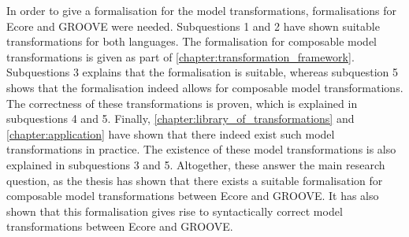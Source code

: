 In order to give a formalisation for the model transformations, formalisations for Ecore and GROOVE were needed. Subquestions 1 and 2 have shown suitable transformations for both languages. The formalisation for composable model transformations is given as part of \cref{chapter:transformation_framework}. Subquestions 3 explains that the formalisation is suitable, whereas subquestion 5 shows that the formalisation indeed allows for composable model transformations. The correctness of these transformations is proven, which is explained in subquestions 4 and 5. Finally, \cref{chapter:library_of_transformations} and \cref{chapter:application} have shown that there indeed exist such model transformations in practice. The existence of these model transformations is also explained in subquestions 3 and 5. Altogether, these answer the main research question, as the thesis has shown that there exists a suitable formalisation for composable model transformations between Ecore and GROOVE. It has also shown that this formalisation gives rise to syntactically correct model transformations between Ecore and GROOVE.